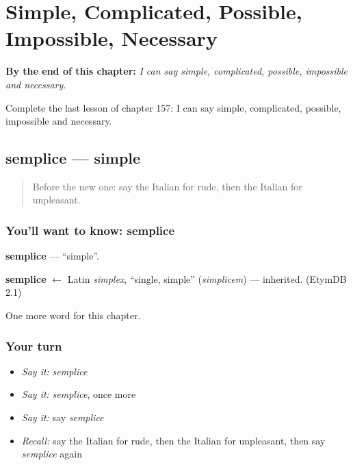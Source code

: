 
\chapter{Simple, Complicated, Possible, Impossible, Necessary}
\label{ch:it-simple-complicated-possible-impossible-necessary}

\begin{chapteropening}
\textbf{By the end of this chapter:} \emph{I can say simple, complicated, possible, impossible and necessary.}

Complete the last lesson of chapter 157: I can say simple, complicated, possible, impossible and necessary.
\end{chapteropening}

\section[semplice]{semplice — simple}

\label{lesson:IT-C157-semplice}



\begin{quote}
Before the new one: say the Italian for rude, then the Italian for unpleasant.
\end{quote}

\subsection*{You'll want to know: semplice}
\textbf{semplice} — \textquotedblleft{}simple\textquotedblright{}.

\begin{cousinweb}
\textbf{semplice} $\leftarrow$ Latin \emph{simplex}, \textquotedblleft{}single, simple\textquotedblright{} (\emph{simplicem}) — inherited. (EtymDB 2.1)
\end{cousinweb}

\begin{grammarlens}[title={What you've built}]
One more word for this chapter.
\end{grammarlens}

\subsection*{Your turn}
\begin{itemize}
\raggedright
  \item \emph{Say it:} \emph{semplice}
  \item \emph{Say it:} \emph{semplice}, once more
  \item \emph{Say it:} say \emph{semplice}
  \item \emph{Recall:} say the Italian for rude, then the Italian for unpleasant, then say \emph{semplice} again
\end{itemize}

